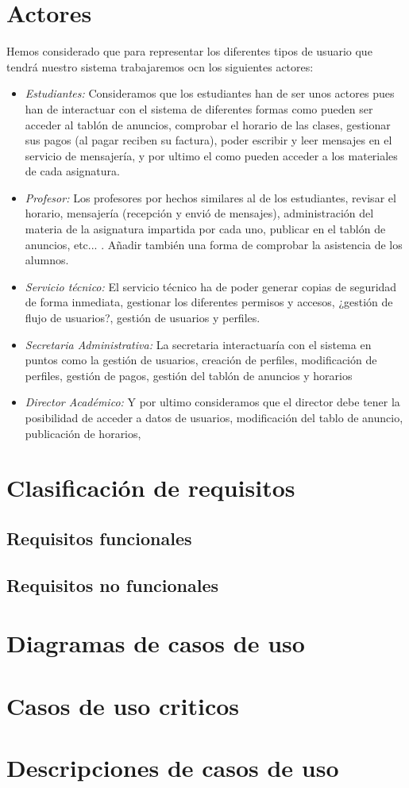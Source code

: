 \documentclass[11pt, a4paper]{article} %
\begin{document}
\section{Actores}
	Hemos considerado que para representar los diferentes tipos de usuario que tendrá nuestro sistema trabajaremos ocn los
	siguientes actores:
	\begin{itemize}
		\item \textit{Estudiantes:} \newline Consideramos que los estudiantes han de ser
		unos actores pues han de interactuar con el sistema de diferentes formas como pueden ser
		acceder al tablón de anuncios, comprobar el horario de las clases, gestionar sus pagos (al pagar reciben su factura),
		poder escribir y leer mensajes en el servicio de mensajería, y por ultimo el como pueden acceder a los materiales
		de cada asignatura.
		\item \textit{Profesor:} \newline Los profesores por hechos similares al de los estudiantes, revisar el horario, mensajería
		(recepción y envió de mensajes), administración del materia de la asignatura impartida por cada uno,
		publicar en el tablón de anuncios, etc... . Añadir también una forma de comprobar la asistencia de los alumnos.
		\item \textit{Servicio técnico:} \newline El servicio técnico ha de poder generar copias de seguridad de forma inmediata,
		gestionar los diferentes permisos y accesos, ¿gestión de flujo de usuarios?, gestión de usuarios y perfiles.
		\item \textit{Secretaria Administrativa:} \newline La secretaria interactuaría con el sistema en puntos como la gestión de usuarios,
		creación de perfiles, modificación de perfiles, gestión de pagos, gestión del tablón de anuncios y horarios
		\item \textit{Director Académico:} \newline Y por ultimo consideramos que el director debe tener la posibilidad de acceder a datos
		de usuarios, modificación del tablo de anuncio, publicación de horarios,
	\end{itemize}

\section{Clasificación de requisitos}
\subsection{Requisitos funcionales}
\subsection{Requisitos no funcionales}
\section{Diagramas de casos de uso}
\section{Casos de uso criticos}

\section{Descripciones de casos de uso}
\end{document}
